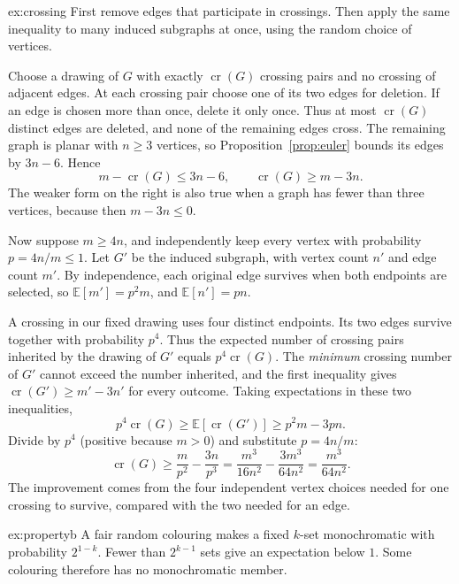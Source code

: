 \begin{solution}{ex:crossing}
\idea First remove edges that participate in crossings. Then apply the same inequality to many induced subgraphs at once, using the random choice of vertices.

\writeup Choose a drawing of $G$ with exactly $\operatorname{cr}(G)$ crossing pairs and no crossing of adjacent edges. At each crossing pair choose one of its two edges for deletion. If an edge is chosen more than once, delete it only once. Thus at most $\operatorname{cr}(G)$ distinct edges are deleted, and none of the remaining edges cross. The remaining graph is planar with $n\ge3$ vertices, so Proposition~\ref{prop:euler} bounds its edges by $3n-6$. Hence
\[
 m-\operatorname{cr}(G)\le3n-6,
 \qquad \operatorname{cr}(G)\ge m-3n.
\]
The weaker form on the right is also true when a graph has fewer than three vertices, because then $m-3n\le0$.

Now suppose $m\ge4n$, and independently keep every vertex with probability $p=4n/m\le1$. Let $G'$ be the induced subgraph, with vertex count $n'$ and edge count $m'$. By independence, each original edge survives when both endpoints are selected, so $\mathbb E[m']=p^2m$, and $\mathbb E[n']=pn$.

A crossing in our fixed drawing uses four distinct endpoints. Its two edges survive together with probability $p^4$. Thus the expected number of crossing pairs inherited by the drawing of $G'$ equals $p^4\operatorname{cr}(G)$. The \emph{minimum} crossing number of $G'$ cannot exceed the number inherited, and the first inequality gives $\operatorname{cr}(G')\ge m'-3n'$ for every outcome. Taking expectations in these two inequalities,
\[
 p^4\operatorname{cr}(G)\ge
 \mathbb E[\operatorname{cr}(G')]
 \ge p^2m-3pn.
\]
Divide by $p^4$ (positive because $m>0$) and substitute $p=4n/m$:
\[
 \operatorname{cr}(G)\ge\frac{m}{p^2}-\frac{3n}{p^3}
 =\frac{m^3}{16n^2}-\frac{3m^3}{64n^2}
 =\frac{m^3}{64n^2}.
\]
The improvement comes from the four independent vertex choices needed for one crossing to survive, compared with the two needed for an edge.
\end{solution}

\begin{solution}{ex:propertyb}
\writeup A fair random colouring makes a fixed $k$-set monochromatic with probability $2^{1-k}$. Fewer than $2^{k-1}$ sets give an expectation below $1$. Some colouring therefore has no monochromatic member.
\end{solution}

